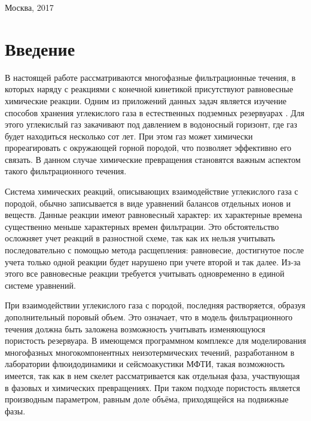 \documentclass[14pt,a4paper]{extarticle}
\begin{document}
\vfill

\begin{center}
	Москва, 2017
\end{center}

\onehalfspacing

\restoregeometry

\clearpage
\tableofcontents
\clearpage

\section*{Введение}

В настоящей работе рассматриваются многофазные фильтрационные течения, в которых наряду с реакциями с конечной кинетикой присутствуют равновесные химические реакции. Одним из приложений данных задач является изучение способов хранения углекислого газа в естественных подземных резервуарах \cite{mgeik}. Для этого углекислый газ закачивают под давлением в водоносный горизонт, где газ будет находиться несколько сот лет. При этом газ может химически прореагировать с окружающей горной породой, что позволяет эффективно его связать. В данном случае химические превращения становятся важным аспектом такого фильтрационного течения.

Система химических реакций, описывающих взаимодействие углекислого газа с породой, обычно записывается в виде уравнений балансов отдельных ионов и веществ. Данные реакции имеют равновесный характер: их характерные времена  существенно меньше характерных времен фильтрации. Это обстоятельство осложняет учет реакций в разностной схеме, так как их нельзя учитывать последовательно с помощью метода расщепления: равновесие, достигнутое после учета только одной реакции будет нарушено при учете второй и так далее. Из-за этого все равновесные реакции требуется учитывать одновременно в единой системе уравнений.

При взаимодействии углекислого газа с породой, последняя растворяется, образуя дополнительный поровый объем. Это означает, что в модель фильтрационного течения должна быть заложена возможность учитывать изменяющуюся пористость резервуара. В имеющемся программном комплексе для моделирования многофазных многокомпонентных неизотермических течений, разработанном в лаборатории флюидодинамики и сейсмоакустики МФТИ, такая возможность имеется, так как в нем скелет рассматривается как отдельная фаза, участвующая в фазовых и химических превращениях. При таком подходе пористость является производным параметром, равным доле объёма, приходящейся на подвижные фазы.
\end{document}
